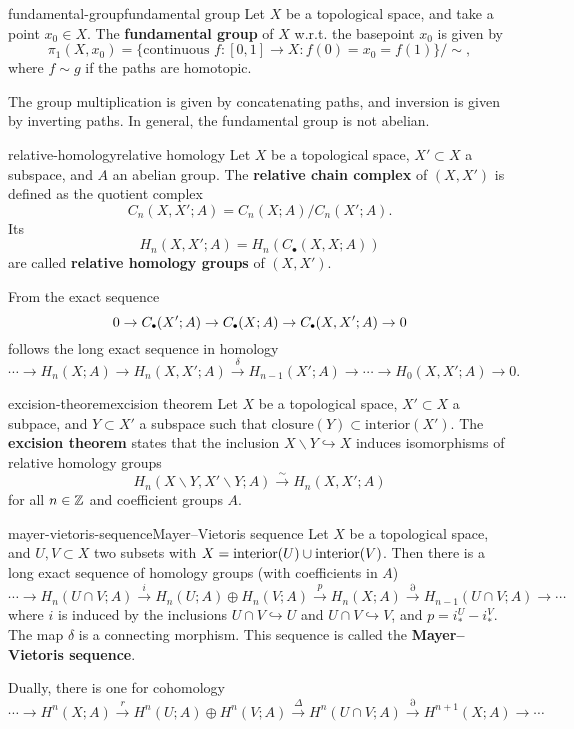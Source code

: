 \begin{topic}{fundamental-group}{fundamental group}
    Let $X$ be a topological space, and take a point $x_0 \in X$. The \textbf{fundamental group} of $X$ w.r.t. the basepoint $x_0$ is given by
    \[ \pi_1(X, x_0) = \{ \text{continuous } f : [0, 1] \to X : f(0) = x_0 = f(1) \} / \sim{} , \]
    where $f \sim{} g$ if the paths are homotopic.
    
    The group multiplication is given by concatenating paths, and inversion is given by inverting paths. In general, the fundamental group is not abelian.
\end{topic}

\begin{topic}{relative-homology}{relative homology}
    Let $X$ be a topological space, $X' \subset X$ a subspace, and $A$ an abelian group. The \textbf{relative chain complex} of $(X, X')$ is defined as the quotient complex
    \[ C_n(X, X'; A) = C_n(X; A) / C_n(X'; A) .  \]
    Its 
    \[ H_n(X, X'; A) = H_n(C_\bullet(X, X; A)) \]
    are called \textbf{relative homology groups} of $(X, X')$.
    
    From the exact sequence
    \[ 0 \to C_\bdot(X'; A) \to C_\bdot(X; A) \to C_\bdot(X, X'; A) \to 0 \]
    follows the long exact sequence in homology
    \[ \cdots \to H_n(X; A) \to H_n(X, X'; A) \xrightarrow{\delta} H_{n - 1}(X'; A) \to \cdots \to H_0(X, X'; A) \to 0 . \]
\end{topic}

\begin{topic}{excision-theorem}{excision theorem}
    Let $X$ be a topological space, $X' \subset X$ a subpace, and $Y \subset X'$ a subspace such that $\text{closure}(Y) \subset \text{interior}(X')$. The \textbf{excision theorem} states that the inclusion $X \backslash Y \hookrightarrow X$ induces isomorphisms of relative homology groups
    \[ H_n(X \backslash Y, X' \backslash Y; A) \xrightarrow{\sim} H_n(X, X'; A) \]
    for all $n \in \mathbb{Z}$ and coefficient groups $A$.
\end{topic}

\begin{topic}{mayer-vietoris-sequence}{Mayer–Vietoris sequence}
    Let $X$ be a topological space, and $U, V \subset X$ two subsets with $X = \textup{interior}(U) \cup \textup{interior}(V)$. Then there is a long exact sequence of homology groups (with coefficients in $A$)
    \[ \cdots \longrightarrow H_n(U \cap V; A) \overset{i}{\longrightarrow} H_n(U; A) \oplus H_n(V; A) \overset{p}{\longrightarrow} H_n(X; A) \overset{\partial}{\longrightarrow} H_{n - 1}(U \cap V; A) \longrightarrow \cdots \]
    where $i$ is induced by the inclusions $U \cap V \hookrightarrow U$ and $U \cap V \hookrightarrow V$, and $p = i_*^U - i_*^V$. The map $\delta$ is a connecting morphism. This sequence is called the \textbf{Mayer–Vietoris sequence}.
    
    Dually, there is one for cohomology
    \[ \cdots \longrightarrow H^n(X; A) \overset{r}{\longrightarrow} H^n(U; A) \oplus H^n(V; A) \overset{\Delta}{\longrightarrow} H^n(U \cap V; A) \overset{\partial}{\longrightarrow} H^{n + 1}(X; A) \longrightarrow \cdots \]
\end{topic}

